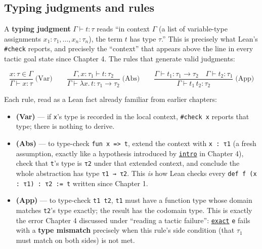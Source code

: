 \subsection{Typing judgments and rules}\label{sec:05-rigor-check:03-typing-rules-and-safety:4}

A \textbf{typing judgment} \(\Gamma \vdash t : \tau\) reads ``in context \(\Gamma\) (a list of variable-type assignments \(x_1:\tau_1, \ldots, x_n:\tau_n\)), the term \(t\) has type \(\tau\).'' This is precisely what Lean's \texttt{\#check} reports, and precisely the ``context'' that appears above the line in every tactic goal state since Chapter 4. The rules that generate valid judgments:

\[
\dfrac{x : \tau \in \Gamma}{\Gamma \vdash x : \tau} \;\text{(Var)}
\qquad
\dfrac{\Gamma, x:\tau_1 \vdash t : \tau_2}{\Gamma \vdash \lambda x.\, t : \tau_1 \to \tau_2} \;\text{(Abs)}
\qquad
\dfrac{\Gamma \vdash t_1 : \tau_1 \to \tau_2 \quad \Gamma \vdash t_2 : \tau_1}{\Gamma \vdash t_1\, t_2 : \tau_2} \;\text{(App)}
\]

Each rule, read as a Lean fact already familiar from earlier chapters:

\begin{itemize}
\tightlist
\item
  \textbf{(Var)} --- if \texttt{x}'s type is recorded in the local context, \texttt{\#check x} reports that type; there is nothing to derive.
\item
  \textbf{(Abs)} --- to type-check \texttt{fun x => t}, extend the context with \texttt{x : τ1} (a fresh assumption, exactly like a hypothesis introduced by \href{https://lean-lang.org/doc/reference/latest/Tactic-Proofs/Tactic-Reference/}{\texttt{intro}} in Chapter 4), check that \texttt{t}'s type is \texttt{τ2} under that extended context, and conclude the whole abstraction has type \texttt{τ1 → τ2}. This \emph{is} how Lean checks every \texttt{def f (x : τ1) : τ2 := t} written since Chapter 1.
\item
  \textbf{(App)} --- to type-check \texttt{t1 t2}, \texttt{t1} must have a function type whose domain matches \texttt{t2}'s type exactly; the result has the codomain type. This is exactly the error Chapter 4 discussed under ``reading a tactic failure'': \href{https://lean-lang.org/doc/reference/latest/Tactic-Proofs/Tactic-Reference/}{\texttt{exact}} \texttt{e} fails with a \textbf{type mismatch} precisely when this rule's side condition (that \(\tau_1\) must match on both sides) is not met.
\end{itemize}


